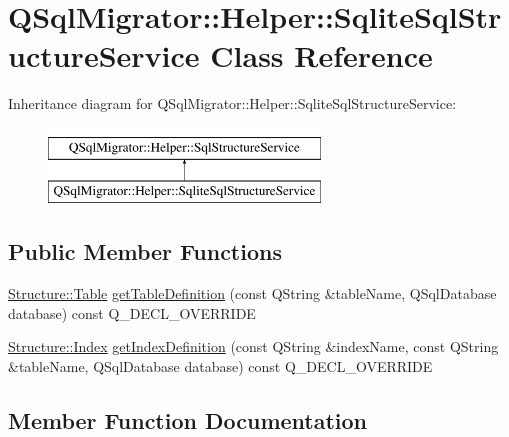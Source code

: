 \hypertarget{class_q_sql_migrator_1_1_helper_1_1_sqlite_sql_structure_service}{}\section{Q\+Sql\+Migrator\+:\+:Helper\+:\+:Sqlite\+Sql\+Structure\+Service Class Reference}
\label{class_q_sql_migrator_1_1_helper_1_1_sqlite_sql_structure_service}
Inheritance diagram for Q\+Sql\+Migrator\+:\+:Helper\+:\+:Sqlite\+Sql\+Structure\+Service\+:\begin{figure}[H]
\begin{center}
\leavevmode
\includegraphics[height=2.000000cm]{class_q_sql_migrator_1_1_helper_1_1_sqlite_sql_structure_service}
\end{center}
\end{figure}
\subsection*{Public Member Functions}
\begin{DoxyCompactItemize}
\item 
\hyperlink{class_q_sql_migrator_1_1_structure_1_1_table}{Structure\+::\+Table} \hyperlink{class_q_sql_migrator_1_1_helper_1_1_sqlite_sql_structure_service_a39ea75353d9471ae6ebffd36865dd52a}{get\+Table\+Definition} (const Q\+String \&table\+Name, Q\+Sql\+Database database) const Q\+\_\+\+D\+E\+C\+L\+\_\+\+O\+V\+E\+R\+R\+I\+DE
\item 
\hyperlink{class_q_sql_migrator_1_1_structure_1_1_index}{Structure\+::\+Index} \hyperlink{class_q_sql_migrator_1_1_helper_1_1_sqlite_sql_structure_service_a89a0b25add0eba4af541a4950889c305}{get\+Index\+Definition} (const Q\+String \&index\+Name, const Q\+String \&table\+Name, Q\+Sql\+Database database) const Q\+\_\+\+D\+E\+C\+L\+\_\+\+O\+V\+E\+R\+R\+I\+DE
\end{DoxyCompactItemize}


\subsection{Member Function Documentation}
\mbox{\label{class_q_sql_migrator_1_1_helper_1_1_sqlite_sql_structure_service_a89a0b25add0eba4af541a4950889c305}} 
